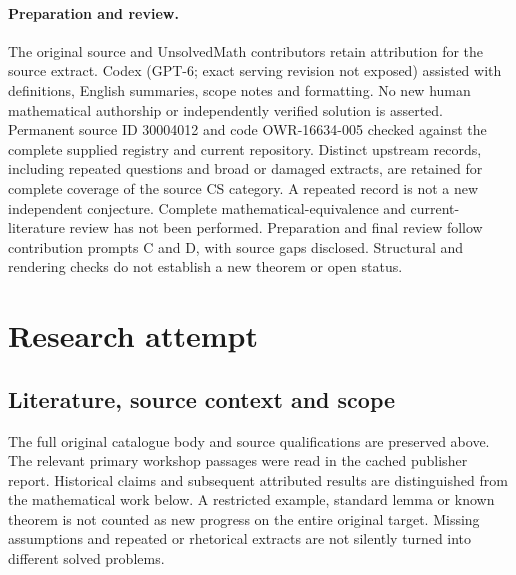 \documentclass[11pt]{article}
\begin{document}
\paragraph{Preparation and review.}
The original source and UnsolvedMath contributors retain attribution for the source extract. Codex (GPT-6; exact serving revision not exposed) assisted with definitions, English summaries, scope notes and formatting. No new human mathematical authorship or independently verified solution is asserted. Permanent source ID 30004012 and code OWR-16634-005 checked against the complete supplied registry and current repository. Distinct upstream records, including repeated questions and broad or damaged extracts, are retained for complete coverage of the source CS category. A repeated record is not a new independent conjecture. Complete mathematical-equivalence and current-literature review has not been performed. Preparation and final review follow contribution prompts C and D, with source gaps disclosed. Structural and rendering checks do not establish a new theorem or open status.
\label{end:30004012}

\section{Research attempt}
\subsection{Literature, source context and scope}
The full original catalogue body and source qualifications are preserved above. The relevant primary workshop passages were read in the cached publisher report. Historical claims and subsequent attributed results are distinguished from the mathematical work below. A restricted example, standard lemma or known theorem is not counted as new progress on the entire original target. Missing assumptions and repeated or rhetorical extracts are not silently turned into different solved problems.
\end{document}
